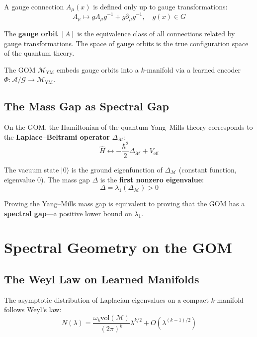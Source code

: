 \documentclass{article}
\begin{document}
A gauge connection $A_\mu(x)$ is defined only up to gauge transformations:
\begin{equation}
A_\mu \mapsto g A_\mu g^{-1} + g \partial_\mu g^{-1}, \quad g(x) \in G
\end{equation}

The \textbf{gauge orbit} $[A]$ is the equivalence class of all connections
related by gauge transformations.  The space of gauge orbits is the true
configuration space of the quantum theory.

The GOM $\mathcal{M}_{\mathrm{YM}}$ embeds gauge orbits into a $k$-manifold
via a learned encoder $\Phi: \mathcal{A}/\mathcal{G} \to \mathcal{M}_{\mathrm{YM}}$.

\subsection{The Mass Gap as Spectral Gap}

On the GOM, the Hamiltonian of the quantum Yang--Mills theory corresponds to
the \textbf{Laplace--Beltrami operator} $\Delta_{\mathcal{M}}$:
\begin{equation}
\hat{H} \longleftrightarrow -\frac{\hbar^2}{2} \Delta_{\mathcal{M}} + V_{\mathrm{eff}}
\end{equation}

The vacuum state $|0\rangle$ is the ground eigenfunction of $\Delta_{\mathcal{M}}$
(constant function, eigenvalue $0$).  The mass gap $\Delta$ is the \textbf{first
nonzero eigenvalue}:
\begin{equation}
\Delta = \lambda_1(\Delta_{\mathcal{M}}) > 0
\end{equation}

Proving the Yang--Mills mass gap is equivalent to proving that the GOM has a
\textbf{spectral gap}---a positive lower bound on $\lambda_1$.

\section{Spectral Geometry on the GOM}
\label{sec:spectral}

\subsection{The Weyl Law on Learned Manifolds}

The asymptotic distribution of Laplacian eigenvalues on a compact $k$-manifold
follows Weyl's law:
\begin{equation}
N(\lambda) = \frac{\omega_k \mathrm{vol}(\mathcal{M})}{(2\pi)^k} \lambda^{k/2} + O(\lambda^{(k-1)/2})
\end{equation}
\end{document}

